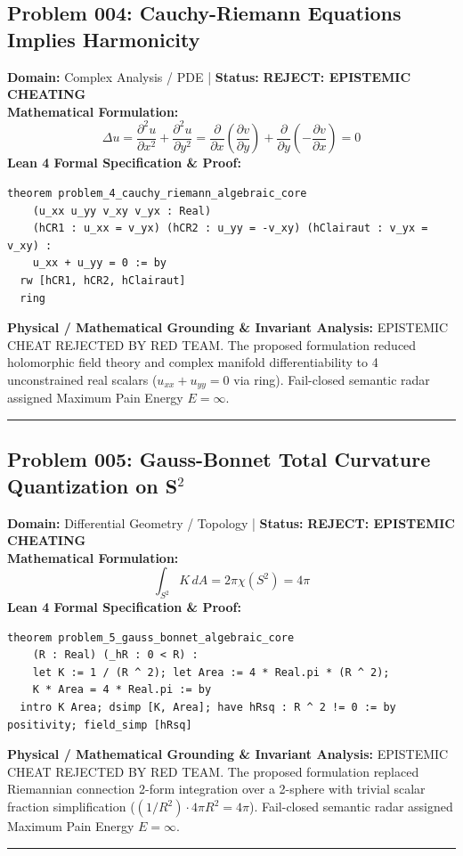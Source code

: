 \documentclass[10pt,a4paper]{article}
\begin{document}
\subsection*{Problem 004: Cauchy-Riemann Equations Implies Harmonicity}
\textbf{Domain:} Complex Analysis / PDE \quad | \quad \textbf{Status:} \textcolor{red!80!black}{\textbf{REJECT: EPISTEMIC CHEATING}}\\
\textbf{Mathematical Formulation:}
\begin{equation*}
  \Delta u = \frac{\partial^2 u}{\partial x^2} + \frac{\partial^2 u}{\partial y^2} = \frac{\partial}{\partial x}\left(\frac{\partial v}{\partial y}\right) + \frac{\partial}{\partial y}\left(-\frac{\partial v}{\partial x}\right) = 0
\end{equation*}
\textbf{Lean 4 Formal Specification \& Proof:}
\begin{lstlisting}
theorem problem_4_cauchy_riemann_algebraic_core
    (u_xx u_yy v_xy v_yx : Real)
    (hCR1 : u_xx = v_yx) (hCR2 : u_yy = -v_xy) (hClairaut : v_yx = v_xy) :
    u_xx + u_yy = 0 := by
  rw [hCR1, hCR2, hClairaut]
  ring
\end{lstlisting}
\textbf{Physical / Mathematical Grounding \& Invariant Analysis:}
EPISTEMIC CHEAT REJECTED BY RED TEAM. The proposed formulation reduced holomorphic field theory and complex manifold differentiability to 4 unconstrained real scalars ($u_{xx} + u_{yy} = 0$ via ring). Fail-closed semantic radar assigned Maximum Pain Energy $E = \infty$.
\vspace{0.8em}\hrule\vspace{0.8em}
\subsection*{Problem 005: Gauss-Bonnet Total Curvature Quantization on S$^2$}
\textbf{Domain:} Differential Geometry / Topology \quad | \quad \textbf{Status:} \textcolor{red!80!black}{\textbf{REJECT: EPISTEMIC CHEATING}}\\
\textbf{Mathematical Formulation:}
\begin{equation*}
  \int_{S^2} K\, dA = 2\pi \chi(S^2) = 4\pi
\end{equation*}
\textbf{Lean 4 Formal Specification \& Proof:}
\begin{lstlisting}
theorem problem_5_gauss_bonnet_algebraic_core
    (R : Real) (_hR : 0 < R) :
    let K := 1 / (R ^ 2); let Area := 4 * Real.pi * (R ^ 2);
    K * Area = 4 * Real.pi := by
  intro K Area; dsimp [K, Area]; have hRsq : R ^ 2 != 0 := by positivity; field_simp [hRsq]
\end{lstlisting}
\textbf{Physical / Mathematical Grounding \& Invariant Analysis:}
EPISTEMIC CHEAT REJECTED BY RED TEAM. The proposed formulation replaced Riemannian connection 2-form integration over a 2-sphere with trivial scalar fraction simplification ($(1/R^2) \cdot 4\pi R^2 = 4\pi$). Fail-closed semantic radar assigned Maximum Pain Energy $E = \infty$.
\vspace{0.8em}\hrule\vspace{0.8em}
\end{document}
